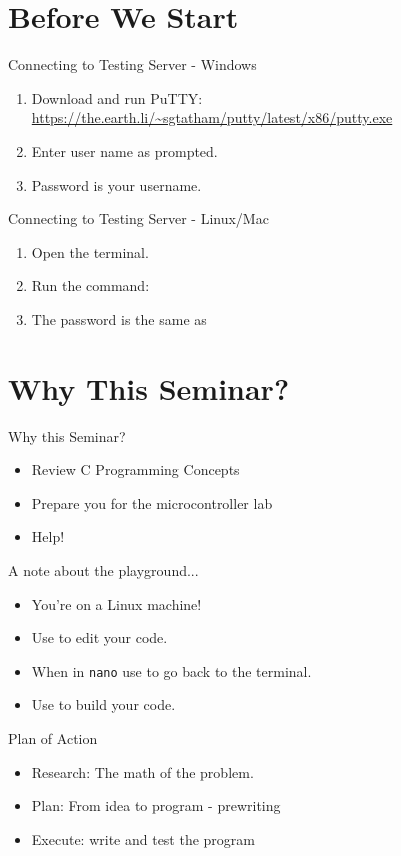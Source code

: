 \documentclass[main.tex]{subfile}
\begin{document}
\section{Before We Start} 
\label{sec:tools}

\begin{frame}{Connecting to Testing Server - Windows}
	\begin{enumerate}
		\item Download and run PuTTY: 
			\\\url{https://the.earth.li/~sgtatham/putty/latest/x86/putty.exe}
		\item Enter user name as prompted.
		\item Password is your username.
	\end{enumerate}
\end{frame}

\begin{frame}{Connecting to Testing Server - Linux/Mac}
	\begin{enumerate}
		\item Open the terminal.
		\item Run the command: 
		\item The password is the same as 
	\end{enumerate}
\end{frame}

\section{Why This Seminar?} 
\label{sec:why_this_seminar}
\begin{frame}{Why this Seminar?}
	\begin{itemize}
		\item Review C Programming Concepts
		\item Prepare you for the microcontroller lab
		\item Help!
	\end{itemize}
\end{frame}

\begin{frame}{A note about the playground...}
	\begin{itemize}
			\item You're on a Linux machine! 
			\item Use  to edit your code.
			\item When in \texttt{nano} use  to go back to the terminal.
			\item Use  to build your code.
	\end{itemize}
\end{frame}

\begin{frame}{Plan of Action}
	\begin{itemize}
		\item Research: The math of the problem.
		\item Plan: From idea to program - prewriting
		\item Execute: write and test the program
	\end{itemize}
\end{frame}
\end{document}
